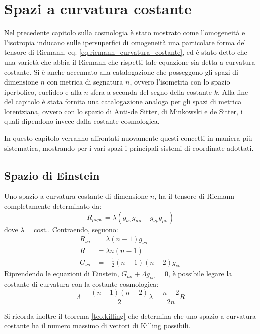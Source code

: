 \chapter{Spazi a curvatura costante}\label{para.curvacost}
Nel precedente capitolo sulla cosmologia è stato mostrato come l'omogeneità e l'isotropia inducano sulle ipersuperfici di omogeneità una particolare forma del tensore di Riemann, eq. \ref{eq.riemann_curvatura_costante}, ed è stato detto che una varietà che abbia il Riemann che rispetti tale equazione sia detta a curvatura costante. Si è anche accennato alla catalogazione che posseggono gli spazi di dimensione $n$ con metrica di segnatura $n$, ovvero l'isometria con lo spazio iperbolico, euclideo e alla $n$-sfera a seconda del segno della costante $k$. Alla fine del capitolo è stata fornita una catalogazione analoga per gli spazi di metrica lorentziana, ovvero con lo spazio di Anti-de Sitter, di Minkowski e de Sitter, i quali dipendono invece dalla costante cosmologica.

In questo capitolo verranno affrontati nuovamente questi concetti in maniera più sistematica, mostrando per i vari spazi i principali sistemi di coordinate adottati.

\section{Spazio di Einstein}
Uno spazio a curvatura costante di dimensione $n$, ha il tensore di Riemann completamente determinato da:
\begin{equation*}
    R_{\mu\nu\rho\sigma} = \lambda ( g_{\nu\sigma}g_{\mu\rho}  - g_{\nu\rho}g_{\mu\sigma})
\end{equation*}
dove $\lambda= \textrm{cost.}$. Contraendo, seguono:
\begin{align*}
    R_{\nu\sigma} &= \lambda (n-1) g_{\nu\sigma} \\
    R &= \lambda n(n-1) \\
    G_{\nu\sigma} &= - \frac{1}{2}(n-1)(n-2) g_{\nu\sigma}
\end{align*}
Riprendendo le equazioni di Einstein, $G_{\nu\sigma} + \Lambda g_{\nu\sigma} = 0$, è possibile legare la costante di curvatura con la costante cosmologica:
\begin{equation*}
    \Lambda = \frac{(n-1)(n-2)}{2}\lambda = \frac{n-2}{2n}R
\end{equation*}

Si ricorda inoltre il teorema \ref{teo.killing} che determina che uno spazio a curvatura costante ha il numero massimo di vettori di Killing possibili.

